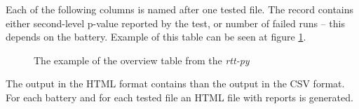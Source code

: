 \documentclass[
  digital,     %
  oneside,     %
  nosansbold,  %
  nocolorbold, %
  nolof,         %
  nolot,         %
]{fithesis4}
\begin{document}
Each of the following columns is named after one tested file. The record contains either second-level p-value reported by the test, or number of failed runs -- this depends on the battery. Example of this table can be seen at figure \ref{fig:rtt_py_table}.
\begin{figure}
  \begin{center}
  \end{center}
  \caption{The example of the overview table from the \emph{rtt-py}}
  \label{fig:rtt_py_table}
\end{figure}


The output in the HTML format contains than the output in the CSV format. For each battery and for each tested file an HTML file with reports is generated.
\end{document}
